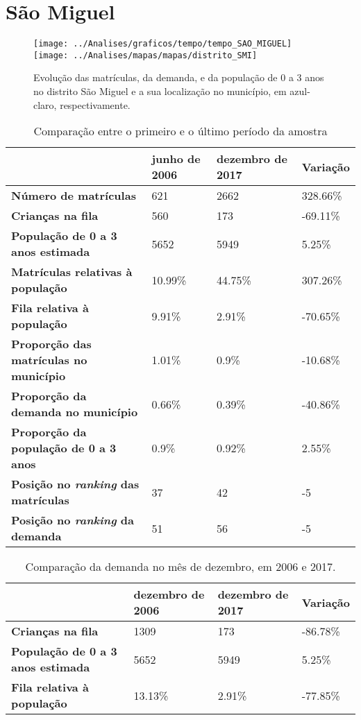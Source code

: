 \section{São Miguel}
\begin{figure}[H]
\centering
\texttt{[image: ../Analises/graficos/tempo/tempo\_SAO\_MIGUEL]}
\texttt{[image: ../Analises/mapas/mapas/distrito\_SMI]}
\caption{Evolução das matrículas, da demanda, e da população de 0 a 3 anos no distrito São Miguel e a sua localização no município, em azul-claro, respectivamente.}
\end{figure}
\begin{table}[H]
\begin{tabular}{l|l|l|l}
\textbf{}                                      & \textbf{junho de 2006}       & \textbf{dezembro de 2017}    & \textbf{Variação} \\ \hline
\textbf{Número de matrículas}                  & 621 & 2662 & 328.66\% \\ \hline
\textbf{Crianças na fila}                      & 560 & 173 & -69.11\% \\ \hline
\textbf{População de 0 a 3 anos estimada}      & 5652 & 5949 & 5.25\% \\ \hline
\textbf{Matrículas relativas à população}      & 10.99\% & 44.75\% & 307.26\% \\ \hline
\textbf{Fila relativa à população}             & 9.91\% & 2.91\% & -70.65\% \\ \hline
\textbf{Proporção das matrículas no município} & 1.01\% & 0.9\% & -10.68\% \\ \hline
\textbf{Proporção da demanda no município}     & 0.66\% & 0.39\% & -40.86\% \\ \hline
\textbf{Proporção da população de 0 a 3 anos}  & 0.9\% & 0.92\% & 2.55\% \\ \hline
\textbf{Posição no \textit{ranking} das matrículas}     & 37 & 42 & -5 \\ \hline
\textbf{Posição no \textit{ranking} da demanda}         & 51 & 56 & -5 \\ 
\end{tabular}
\caption{Comparação entre o primeiro e o último período da amostra}
\end{table}
\begin{table}[H]
\begin{tabular}{l|l|l|l}
\textbf{}                                 & \textbf{dezembro de 2006} & \textbf{dezembro de 2017} & \textbf{Variação} \\ \hline
\textbf{Crianças na fila}                      & 1309 & 173 & -86.78\% \\ \hline
\textbf{População de 0 a 3 anos estimada}      & 5652 & 5949 & 5.25\% \\ \hline
\textbf{Fila relativa à população}             & 13.13\% & 2.91\% & -77.85\% \\
\end{tabular}
\caption{Comparação da demanda no mês de dezembro, em 2006 e 2017.}
\end{table}
